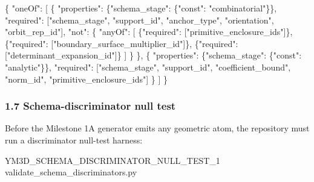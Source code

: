 \documentclass[
]{article}
\newenvironment{Shaded}{}{}
\newcommand{\DataTypeTok}[1]{\textcolor[rgb]{0.56,0.13,0.00}{#1}}
\newcommand{\FunctionTok}[1]{\textcolor[rgb]{0.02,0.16,0.49}{#1}}
\newcommand{\NormalTok}[1]{#1}
\newcommand{\OtherTok}[1]{\textcolor[rgb]{0.00,0.44,0.13}{#1}}
\newcommand{\StringTok}[1]{\textcolor[rgb]{0.25,0.44,0.63}{#1}}
\begin{document}
\begin{Shaded}
\begin{Highlighting}[]
\FunctionTok{\{}
  \DataTypeTok{"oneOf"}\FunctionTok{:} \OtherTok{[}
    \FunctionTok{\{}
      \DataTypeTok{"properties"}\FunctionTok{:} \FunctionTok{\{}\DataTypeTok{"schema\_stage"}\FunctionTok{:} \FunctionTok{\{}\DataTypeTok{"const"}\FunctionTok{:} \StringTok{"combinatorial"}\FunctionTok{\}\},}
      \DataTypeTok{"required"}\FunctionTok{:} \OtherTok{[}\StringTok{"schema\_stage"}\OtherTok{,} \StringTok{"support\_id"}\OtherTok{,} \StringTok{"anchor\_type"}\OtherTok{,} \StringTok{"orientation"}\OtherTok{,} \StringTok{"orbit\_rep\_id"}\OtherTok{]}\FunctionTok{,}
      \DataTypeTok{"not"}\FunctionTok{:} \FunctionTok{\{}
        \DataTypeTok{"anyOf"}\FunctionTok{:} \OtherTok{[}
          \FunctionTok{\{}\DataTypeTok{"required"}\FunctionTok{:} \OtherTok{[}\StringTok{"primitive\_enclosure\_ids"}\OtherTok{]}\FunctionTok{\}}\OtherTok{,}
          \FunctionTok{\{}\DataTypeTok{"required"}\FunctionTok{:} \OtherTok{[}\StringTok{"boundary\_surface\_multiplier\_id"}\OtherTok{]}\FunctionTok{\}}\OtherTok{,}
          \FunctionTok{\{}\DataTypeTok{"required"}\FunctionTok{:} \OtherTok{[}\StringTok{"determinant\_expansion\_id"}\OtherTok{]}\FunctionTok{\}}
        \OtherTok{]}
      \FunctionTok{\}}
    \FunctionTok{\}}\OtherTok{,}
    \FunctionTok{\{}
      \DataTypeTok{"properties"}\FunctionTok{:} \FunctionTok{\{}\DataTypeTok{"schema\_stage"}\FunctionTok{:} \FunctionTok{\{}\DataTypeTok{"const"}\FunctionTok{:} \StringTok{"analytic"}\FunctionTok{\}\},}
      \DataTypeTok{"required"}\FunctionTok{:} \OtherTok{[}\StringTok{"schema\_stage"}\OtherTok{,} \StringTok{"support\_id"}\OtherTok{,} \StringTok{"coefficient\_bound"}\OtherTok{,} \StringTok{"norm\_id"}\OtherTok{,} \StringTok{"primitive\_enclosure\_ids"}\OtherTok{]}
    \FunctionTok{\}}
  \OtherTok{]}
\FunctionTok{\}}
\end{Highlighting}
\end{Shaded}

\subsubsection{1.7 Schema-discriminator null
test}\label{schema-discriminator-null-test}

Before the Milestone 1A generator emits any geometric atom, the
repository must run a discriminator null-test harness:

\begin{Shaded}
\begin{Highlighting}[]
\NormalTok{YM3D\_SCHEMA\_DISCRIMINATOR\_NULL\_TEST\_1}
\NormalTok{validate\_schema\_discriminators.py}
\end{Highlighting}
\end{Shaded}
\end{document}
